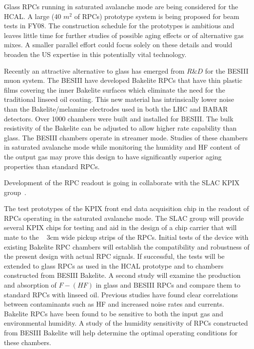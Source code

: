 \documentclass[12pt,twoside,a4paper]{book}
\begin{document}
Glass RPCs running in saturated avalanche mode are being considered for the HCAL. A large (40 $m^2$ of RPCs) prototype system is being proposed
for beam tests in FY08. The construction schedule for the prototypes is ambitious and leaves little time for further studies of possible aging effects or of alternative gas mixes. A smaller parallel effort could focus solely on these details and would broaden the US expertise in this potentially vital technology.

Recently an attractive alternative to glass has emerged from $R\&D$ for the BESIII muon system. The BESIII have developed Bakelite RPCs that have thin plastic films covering the inner Bakelite surfaces which eliminate the need for the traditional linseed oil coating. This new material has intrinsically lower noise than the Bakelite/melamine electrodes used in both the LHC and BABAR detectors. Over 1000 chambers were built and installed for BESIII. The bulk resistivity of the Bakelite can be adjusted to allow higher rate capability than glass. The BESIII chambers operate in streamer mode. Studies of these chambers in saturated avalanche mode while monitoring the humidity and HF content of the output gas may prove this design to have significantly superior aging properties than standard RPCs.

Development of the RPC readout is going in collaborate with the SLAC KPIX group~\cite{}.

The test prototypes of the KPIX front end data acquisition chip in the readout of RPCs operating in the saturated avalanche mode. The SLAC group will provide several KPIX chips for testing and aid in the design of a chip carrier that will mate to the ~ 3cm wide pickup strips of the RPCs. Initial tests of the device with existing Bakelite RPC chambers will establish the compatibility and robustness of the present design with actual RPC signals. If successful, the tests will be extended to glass RPCs as used in the HCAL prototype and to chambers constructed from BESIII Bakelite.
A second study will examine the production and absorption of $F-(HF)$ in glass and BESIII RPCs and compare them to standard RPCs with linseed oil. Previous studies have found clear correlations between contaminants such as HF and increased noise rates and currents. Bakelite RPCs have been found to be sensitive to both the input gas and environmental humidity. A study of the humidity sensitivity of RPCs constructed from BESIII Bakelite will help determine the optimal operating conditions for these chambers.
\end{document}
